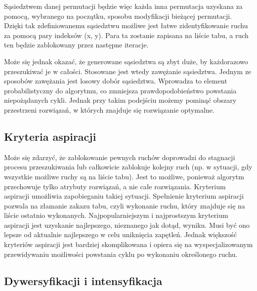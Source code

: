 Sąsiedztwem danej permutacji będzie więc każda inna permutacja uzyskana za pomocą, wybranego na początku, sposobu modyfikacji bieżącej permutacji. Dzięki tak zdefiniowanemu sąsiedztwu możliwe jest łatwe zidentyfikowanie ruchu za pomocą pary indeksów (x, y). Para ta zostanie zapisana na liście tabu, a ruch ten będzie zablokowany przez następne iteracje.

Może się jednak okazać, że generowane sąsiedztwa są zbyt duże, by każdorazowo przeszukiwać je w całości. Stosowane jest wtedy zawężanie sąsiedztwa. Jednym ze sposobów zawężania jest losowy dobór sąsiedztwa. Wprowadza to element probabilistyczny do algorytmu, co zmniejsza prawdopodobieństwo powstania niepożądanych cykli. Jednak przy takim podejściu możemy pominąć obszary przestrzeni rozwiązań, w których znajduje się rozwiązanie optymalne.

\subsection{Kryteria aspiracji}

Może się zdarzyć, że zablokowanie pewnych ruchów doprowadzi do stagnacji procesu przeszukiwania lub całkowicie zablokuje kolejny ruch (np. w sytuacji, gdy wszystkie możliwe ruchy są na liście tabu). Jest to możliwe, ponieważ algorytm przechowuje tylko atrybuty rozwiązań, a nie całe rozwiązania. Kryterium aspiracji umożliwia zapobieganiu takiej sytuacji.
Spełnienie kryterium aspiracji pozwala na złamanie zakazu tabu, czyli wykonanie ruchu, który znajduje się na liście ostatnio wykonanych. Najpopularniejszym i najprostszym kryterium aspiracji jest uzyskanie najlepszego, nieznanego jak dotąd, wyniku. Musi być ono lepsze od aktualnie najlepszego w celu uniknięcia zapętleń. Jednak większość kryteriów aspiracji jest bardziej skomplikowana i opiera się na wyspecjalizowanym przewidywaniu możliwości powstania cyklu po wykonaniu określonego ruchu.

\subsection{Dywersyfikacji i intensyfikacja}

